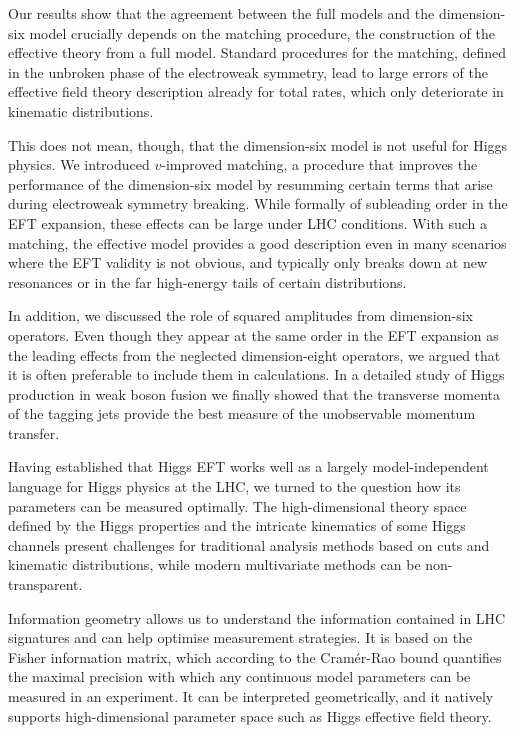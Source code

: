 Our results show that the agreement between the full models and the
dimension-six model crucially depends on the matching procedure, \ie
the construction of the effective theory from a full model. Standard
procedures for the matching, defined in the unbroken phase of the
electroweak symmetry, lead to large errors of the effective field
theory description already for total rates, which only deteriorate
in kinematic distributions.

This does not mean, though, that the dimension-six model is not useful for
Higgs physics. We introduced $v$-improved matching, a procedure that
improves the performance of the dimension-six model by resumming
certain terms that arise during electroweak symmetry breaking. While
formally of subleading order in the EFT expansion, these effects can
be large under LHC conditions. With such a matching, the effective
model provides a good description even in many scenarios where the EFT
validity is not obvious, and typically only breaks down at new
resonances or in the far high-energy tails of certain distributions.

In addition, we discussed the role of squared amplitudes from dimension-six
operators. Even though they appear at the same order in the EFT
expansion as the leading effects from the neglected dimension-eight
operators, we argued that it is often preferable to include them
in calculations. In a detailed study of Higgs production in weak boson
fusion we finally showed that the transverse momenta of the tagging
jets provide the best measure of the unobservable momentum transfer.

\newparagraph
%
Having established that Higgs EFT works well as a largely
model-independent language for Higgs physics at the LHC, we turned to
the question how its parameters can be measured optimally. The
high-dimensional theory space defined by the Higgs properties and the
intricate kinematics of some Higgs channels present challenges for
traditional analysis methods based on cuts and kinematic
distributions, while modern multivariate methods can be non-transparent.

Information geometry allows us to understand the information contained
in LHC signatures and can help optimise measurement strategies. It is
based on the Fisher information matrix, which according to the
Cram\'er-Rao bound quantifies the maximal precision with which any
continuous model parameters can be measured in an experiment. It can be
interpreted geometrically, and it natively supports high-dimensional
parameter space such as Higgs effective field theory.

